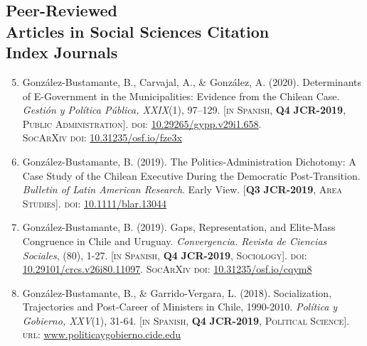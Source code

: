 \documentclass[letterpaper,margin]{res}
\newenvironment{benumerate}[1]{
    \let\oldItem\item
    \def\item{\addtocounter{enumi}{-2}\oldItem}
    \begin{enumerate}
    \setcounter{enumi}{#1}
    \addtocounter{enumi}{1}
}{
    \end{enumerate}
}
\begin{document}
\begin{resume}

\section{\footnotesize Peer-Reviewed \\ Articles in Social Sciences Citation \\ Index Journals}

\begin{benumerate}{4}
\item{\small Gonz\'alez-Bustamante, B., Carvajal, A., \& Gonz\'alez, A. (2020). Determinants of E-Government in the Municipalities: Evidence from the Chilean Case. {\itshape Gesti\'on y Pol\'itica P\'ublica, XXIX}(1), 97--129. {\footnotesize \scshape [in Spanish, {\bfseries \small Q4} {\bfseries JCR-2019}, Public Administration]}. {\scshape doi:} \href{http://dx.doi.org/10.29265/gypp.v29i1.658}{10.29265/gypp.v29i1.658}. \\ {\scshape {\footnotesize SocArXiv} doi}: \href{https://doi.org/10.31235/osf.io/fze3x}{10.31235/osf.io/fze3x}}\vspace{1mm}

\item{\small Gonz\'alez-Bustamante, B. (2019). The Politics-Administration Dichotomy: A Case Study of the Chilean Executive During the Democratic Post-Transition. {\itshape Bulletin of Latin American Research}. Early View. {\footnotesize \scshape [{\bfseries \small Q3} {\bfseries JCR-2019}, Area Studies]}. {\scshape doi}: \href{https://doi.org/10.1111/blar.13044}{10.1111/blar.13044}}\pagebreak

\item{\small Gonz\'alez-Bustamante, B. (2019). Gaps, Representation, and Elite-Mass Congruence in Chile and Uruguay. {\itshape Convergencia. Revista de Ciencias Sociales}, (80), 1-27. {\footnotesize \scshape [in Spanish, {\bfseries \small Q4} {\bfseries JCR-2019}, Sociology]}. {\scshape doi}: \href{https://doi.org/10.29101/crcs.v26i80.11097}{10.29101/crcs.v26i80.11097}. {\scshape {\footnotesize SocArXiv} doi}: \href{https://doi.org/10.31235/osf.io/cqym8}{10.31235/osf.io/cqym8}}\vspace{1mm}

\item{\small Gonz\'alez-Bustamante, B., \& Garrido-Vergara, L. (2018). Socialization, Trajectories and Post-Career of Ministers in Chile, 1990-2010. {\itshape Pol\'itica y Gobierno, XXV}(1), 31-64. {\footnotesize \scshape [in Spanish, {\bfseries \small Q4} {\bfseries JCR-2019}, Political Science]}. {\scshape url}: \href{http://www.politicaygobierno.cide.edu/index.php/pyg/article/view/1080}{www.politicaygobierno.cide.edu}}
\end{benumerate}


\end{resume}
\end{document}

